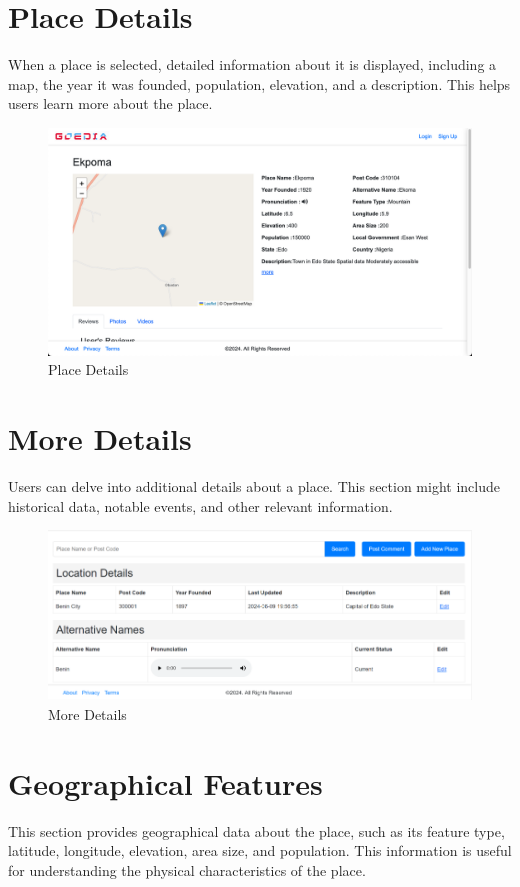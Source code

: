 \section{Place Details}
When a place is selected, detailed information about it is displayed, including a map, the year it was founded, population, elevation, and a description. This helps users learn more about the place.

\begin{figure}[H]
    \centering
    \includegraphics[width=\textwidth]{placeDetails.png}
    \caption{Place Details}
    \label{fig:placeDetails}
\end{figure}

\section{More Details}
Users can delve into additional details about a place. This section might include historical data, notable events, and other relevant information.

\begin{figure}[H]
    \centering
    \includegraphics[width=\textwidth]{moreDetails.png}
    \caption{More Details}
    \label{fig:moreDetails}
\end{figure}

\section{Geographical Features}
This section provides geographical data about the place, such as its feature type, latitude, longitude, elevation, area size, and population. This information is useful for understanding the physical characteristics of the place.

